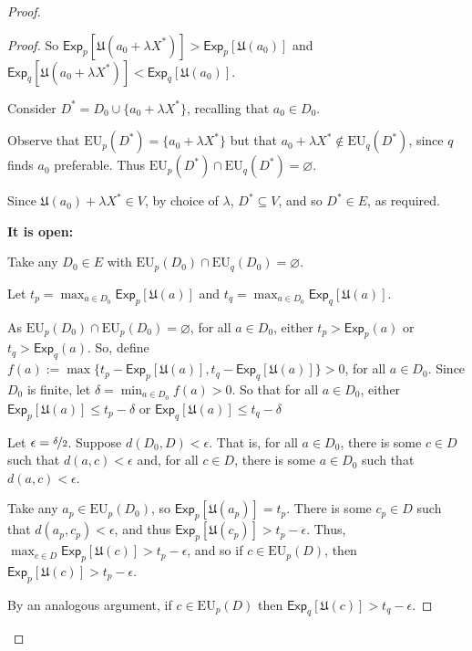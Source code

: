 \documentclass[a4paper,final]{article}
\newcommand\Exp{\mathsf{Exp}}
\newcommand\EU{\mathrm{EU}}
\newcommand\U{\mathfrak{U}} %
\renewcommand{\emptyset}{\varnothing}
\renewcommand{\leq}{\leqslant}
\newenvironment{CCM rewritten}
{\begingroup\color{blue}} %
{\endgroup}              %
\begin{document}
\begin{proof}
\begin{proof}
		So $\Exp_{p}[\U(a_0+\lambda X^*)]>\Exp_{p}[\U(a_0)]$ and $\Exp_{q}[\U(a_0+\lambda X^*)]<\Exp_{q}[\U(a_0)]$.
		
		Consider $D^*=D_0\cup\{a_0+\lambda X^*\}$, recalling that $a_0\in D_0$. 
		
		Observe that $\EU_{p}(D^*)=\{a_0+\lambda X^*\}$ but that $a_0+\lambda X^*\notin\EU_{q}(D^*)$, since $q$ finds $a_0$ preferable. 
		Thus $\EU_{p}(D^*)\cap \EU_{q}(D^*)=\emptyset$.
		
		Since $\U(a_0)+\lambda X^*\in V$, by choice of $\lambda$, $D^*\subseteq V$, and so $D^*\in E$, as required. 
		
		\textbf{It is open:}
		
		Take any $D_0\in E$ with $\EU_{p}(D_0)\cap \EU_{q}(D_0)=\emptyset$. 
		
		Let $t_p=\max_{a\in D_0}\Exp_{p}[\U(a)]$ and $t_q=\max_{a\in D_0}\Exp_{q}[\U(a)]$.
		
		As  $\EU_{p}(D_0)\cap \EU_{p}(D_0)=\emptyset$, for all $a\in D_0$, either $t_p>\Exp_{p}(a)$ or  $t_q>\Exp_{q}(a)$. So, define $f(a):=\max\{t_p-\Exp_{p}[\U(a)],t_q-\Exp_{q}[\U(a)]\}>0$, for all $a\in D_0$. Since $D_0$ is finite, let $\delta=\min_{a\in D_0}f(a)>0$. So that for all $a\in D_0$, either  $\Exp_{p}[\U(a)]\leq t_p-\delta$ or $\Exp_{q}[\U(a)]\leq t_q-\delta$
		
		Let $\epsilon=\nicefrac{\delta}{2}$. Suppose $d(D_0,D)<\epsilon$. That is, for all $a\in D_0$, there is some $c\in D$ such that $d(a,c)<\epsilon$ and, for all $c\in D$, there is some $a\in D_0$ such that $d(a,c)<\epsilon$. 
		
		Take any $a_p\in \EU_{p}(D_0)$, so $\Exp_{p}[\U(a_p)]=t_p$. There is some $c_p\in D$ such that $d(a_p,c_p)<\epsilon$, and thus $\Exp_{p}[\U(c_p)]>t_p-\epsilon$. Thus, $\max_{c\in D}\Exp_{p}[\U(c)]>t_p-\epsilon$, and so if $c\in \EU_{p}(D)$, then $\Exp_{p}[\U(c)]>t_p-\epsilon$. 
		
		
		By an analogous argument, if $c\in \EU_{p}(D)$ then $\Exp_{q}[\U(c)]>t_q-\epsilon$. 
		

\end{proof}
\end{proof}
\end{document}
